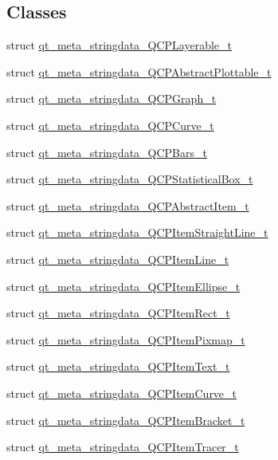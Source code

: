 \subsection*{Classes}
\begin{DoxyCompactItemize}
\item 
struct \hyperlink{a00067_de/dd2/a00207}{qt\+\_\+meta\+\_\+stringdata\+\_\+\+Q\+C\+P\+Layerable\+\_\+t}
\item 
struct \hyperlink{a00067_dd/da2/a00192}{qt\+\_\+meta\+\_\+stringdata\+\_\+\+Q\+C\+P\+Abstract\+Plottable\+\_\+t}
\item 
struct \hyperlink{a00067_d7/ded/a00196}{qt\+\_\+meta\+\_\+stringdata\+\_\+\+Q\+C\+P\+Graph\+\_\+t}
\item 
struct \hyperlink{a00067_d3/d2a/a00195}{qt\+\_\+meta\+\_\+stringdata\+\_\+\+Q\+C\+P\+Curve\+\_\+t}
\item 
struct \hyperlink{a00067_dc/d57/a00194}{qt\+\_\+meta\+\_\+stringdata\+\_\+\+Q\+C\+P\+Bars\+\_\+t}
\item 
struct \hyperlink{a00067_da/de7/a00210}{qt\+\_\+meta\+\_\+stringdata\+\_\+\+Q\+C\+P\+Statistical\+Box\+\_\+t}
\item 
struct \hyperlink{a00067_d7/d6e/a00190}{qt\+\_\+meta\+\_\+stringdata\+\_\+\+Q\+C\+P\+Abstract\+Item\+\_\+t}
\item 
struct \hyperlink{a00067_d1/d72/a00204}{qt\+\_\+meta\+\_\+stringdata\+\_\+\+Q\+C\+P\+Item\+Straight\+Line\+\_\+t}
\item 
struct \hyperlink{a00067_dd/de3/a00201}{qt\+\_\+meta\+\_\+stringdata\+\_\+\+Q\+C\+P\+Item\+Line\+\_\+t}
\item 
struct \hyperlink{a00067_d3/db1/a00200}{qt\+\_\+meta\+\_\+stringdata\+\_\+\+Q\+C\+P\+Item\+Ellipse\+\_\+t}
\item 
struct \hyperlink{a00067_de/d79/a00203}{qt\+\_\+meta\+\_\+stringdata\+\_\+\+Q\+C\+P\+Item\+Rect\+\_\+t}
\item 
struct \hyperlink{a00067_db/d53/a00202}{qt\+\_\+meta\+\_\+stringdata\+\_\+\+Q\+C\+P\+Item\+Pixmap\+\_\+t}
\item 
struct \hyperlink{a00067_d5/d13/a00205}{qt\+\_\+meta\+\_\+stringdata\+\_\+\+Q\+C\+P\+Item\+Text\+\_\+t}
\item 
struct \hyperlink{a00067_d8/d72/a00199}{qt\+\_\+meta\+\_\+stringdata\+\_\+\+Q\+C\+P\+Item\+Curve\+\_\+t}
\item 
struct \hyperlink{a00067_d7/da0/a00198}{qt\+\_\+meta\+\_\+stringdata\+\_\+\+Q\+C\+P\+Item\+Bracket\+\_\+t}
\item 
struct \hyperlink{a00067_d5/df1/a00206}{qt\+\_\+meta\+\_\+stringdata\+\_\+\+Q\+C\+P\+Item\+Tracer\+\_\+t}

\end{DoxyCompactItemize}
